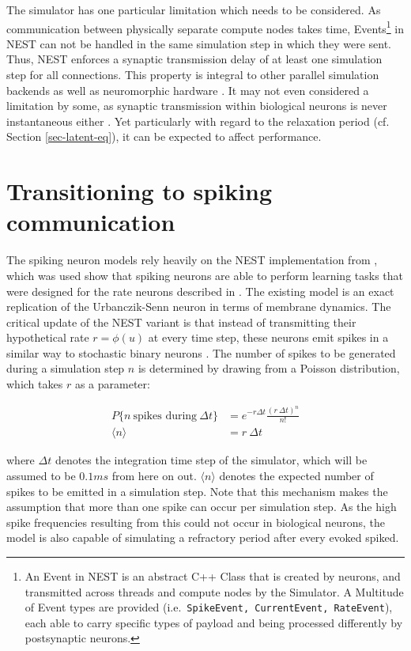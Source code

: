The simulator has one particular limitation which needs to be considered. As communication between physically separate
compute nodes takes time, Events\footnote{An Event in NEST is an abstract C++ Class that is created by neurons, and
transmitted across threads and compute nodes by the Simulator. A Multitude of Event types are provided (i.e.\
\texttt{SpikeEvent, CurrentEvent, RateEvent}), each able to carry specific types of payload and being processed
differently by postsynaptic neurons.} in NEST can not be handled in the same simulation step in which they were sent.
Thus, NEST enforces a synaptic transmission delay of at least one simulation step for all connections. This property is
integral to other parallel simulation backends \citep{Hines1997} as well as neuromorphic hardware
\citep{davies2018loihi}. It may not even considered a limitation by some, as synaptic transmission within biological
neurons is never instantaneous either \citep{kandel2021principles}. Yet particularly with regard to the relaxation
period (cf. Section \ref{sec-latent-eq}), it can be expected to affect performance.


\section{Transitioning to spiking communication}

The spiking neuron models rely heavily on the NEST implementation from \citep{Stapmanns2021}, which was used show that
spiking neurons are able to perform learning tasks that were designed for the rate neurons described in
\citep{urbanczik2014learning}. The existing model is an exact replication of the Urbanczik-Senn neuron in terms of
membrane dynamics. The critical update of the NEST variant is that instead of transmitting their hypothetical rate $r =
\phi(u)$ at every time step, these neurons emit spikes in a similar way to stochastic binary neurons
\citep{Ginzburg1994}. The number of spikes to be generated during a simulation step $n$ is determined by drawing from a
Poisson distribution, which takes $r$ as a parameter:

\begin{align}
  P\{\textit{n} \ \text{spikes during} \ \Delta t\} & = e^{-r \Delta t} \frac{(r \ \Delta t) ^ n}{n!}\label{eq-pr-n-spikes} \\
  \langle \textit{n} \rangle                        & = r \ \Delta t \label{eq-n-spikes}
\end{align}

where $\Delta t$ denotes the integration time step of the simulator, which will be assumed to be $0.1 ms$ from here on
out.  $\langle \textit{n} \rangle$ denotes the expected number of spikes to be emitted in a simulation step. Note that
this mechanism makes the assumption that more than one spike can occur per simulation step. As the high spike
frequencies resulting from this could not occur in biological neurons, the model is also capable of simulating a
refractory period after every evoked spiked.

